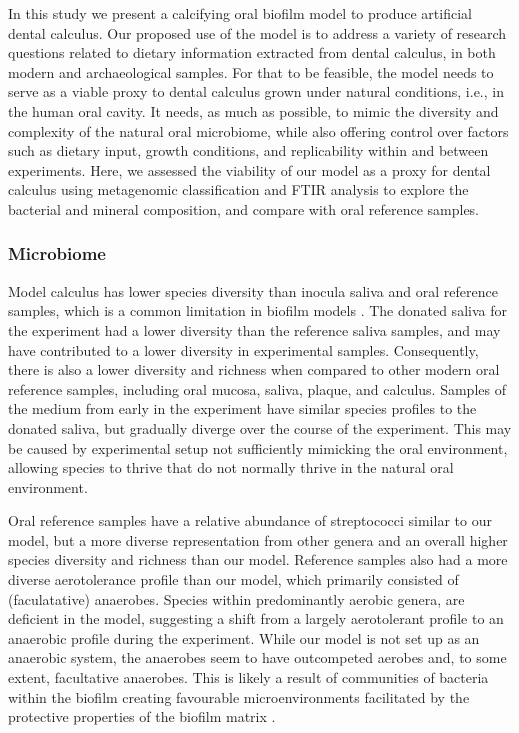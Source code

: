\documentclass[10pt,a4paper]{article}
\begin{document}
In this study we present a calcifying oral biofilm model to produce
artificial dental calculus. Our proposed use of the model is to address
a variety of research questions related to dietary information extracted
from dental calculus, in both modern and archaeological samples. For
that to be feasible, the model needs to serve as a viable proxy to
dental calculus grown under natural conditions, i.e., in the human oral
cavity. It needs, as much as possible, to mimic the diversity and
complexity of the natural oral microbiome, while also offering control
over factors such as dietary input, growth conditions, and replicability
within and between experiments. Here, we assessed the viability of our
model as a proxy for dental calculus using metagenomic classification
and FTIR analysis to explore the bacterial and mineral composition, and
compare with oral reference samples.

\subsubsection*{Microbiome}\label{microbiome}

Model calculus has lower species diversity than inocula saliva and oral
reference samples, which is a common limitation in biofilm models
\citep{edlundBiofilmModel2013, bjarnsholtVivoBiofilm2013}. The donated
saliva for the experiment had a lower diversity than the reference
saliva samples, and may have contributed to a lower diversity in
experimental samples. Consequently, there is also a lower diversity and
richness when compared to other modern oral reference samples, including
oral mucosa, saliva, plaque, and calculus. Samples of the medium from
early in the experiment have similar species profiles to the donated
saliva, but gradually diverge over the course of the experiment. This
may be caused by experimental setup not sufficiently mimicking the oral
environment, allowing species to thrive that do not normally thrive in
the natural oral environment.

Oral reference samples have a relative abundance of streptococci similar
to our model, but a more diverse representation from other genera and an
overall higher species diversity and richness than our model. Reference
samples also had a more diverse aerotolerance profile than our model,
which primarily consisted of (faculatative) anaerobes. Species within
predominantly aerobic genera, are deficient in the model, suggesting a
shift from a largely aerotolerant profile to an anaerobic profile during
the experiment. While our model is not set up as an anaerobic system,
the anaerobes seem to have outcompeted aerobes and, to some extent,
facultative anaerobes. This is likely a result of communities of
bacteria within the biofilm creating favourable microenvironments
facilitated by the protective properties of the biofilm matrix
\citep{flemmingBiofilmsEmergent2016, edlundUncoveringComplex2018}.
\end{document}
